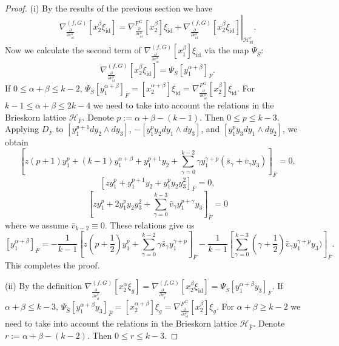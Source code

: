 \documentclass[reqno,12pt]{amsart}
\numberwithin{equation}{section}
\theoremstyle{plain}
\theoremstyle{definition}
\newcommand{\id}{\mathrm{id}}
\def\H{{\mathcal H}}
\numberwithin{equation}{section}
\begin{document}
\begin{proof}

(i) By the results of the previous section we have
\[
\nabla_{\frac{\partial}{\partial v^\alpha_{\id}}}^{(f,G)}[x_2^{\beta}\xi_{\id}] = \nabla^{F^G}_{\frac{\partial}{\partial v^\alpha_{\id}}}[x_2^{\beta}]\xi_{\id} + \left.\nabla_{\frac{\partial}{\partial v^\alpha_{\id}}}^{(f,G)}[x_2^{\beta}\xi_{\id}]\right\vert_{\H^c_{\id}}.
\]
Now we calculate the second term of $\nabla_{\frac{\partial}{\partial v^\alpha_{\id}}}^{(f,G)}[x_1^{\beta}]\xi_{\id}$ via the map $\Psi_{\bar{S}}$:
\[
\nabla_{\frac{\partial}{\partial v^\alpha_{\id}}}^{(f,G)}[x_2^{\beta}\xi_{\id}] = \Psi_{\bar{S}}[y_1^{\alpha+\beta}]_{\bar{F}}.
\]
If $0 \le \alpha+\beta \le k-2$, $\Psi_{\bar{S}} [y_1^{\alpha+\beta}]_{\bar{F}} = [x_2^{\alpha+\beta}]\xi_{\id} = \nabla^{F^G}_{\frac{\partial}{\partial v^\alpha_\id}}[x_2^{\beta}]\xi_{\id}$. For $k-1 \le\alpha+\beta \le 2k-4$ we need to take into account the relations in the Brieskorn lattice $\H_{\bar F}$. Denote $p := \alpha+\beta - (k-1)$. Then $0 \le p \le k-3$. Applying $D_{\bar{F}}$ to $[y_1^{p+1}dy_2\wedge dy_3]$, $-[y_1^{p}y_2dy_1 \wedge dy_3]$, and $[y_1^{p}y_3dy_1\wedge dy_2]$, we obtain
\[
[z (p+1) y_1^{p} + (k-1)y_1^{\alpha+\beta} + y_1^{p+1}y_2 + \sum_{\gamma=0}^{k-2} \gamma  y_1^{\gamma +p}(\bar{s}_\gamma + \bar{v}_\gamma y_3)]_{\bar{F}} = 0,
\]
\[
[z y_1^{p} + y_1^{p+1}y_2 + y_1^{p}y_2y_3^2] _{\bar{F}}= 0,
\]
\[
[z y_1^{p} + 2y_1^{p}y_2y_3^2 + \sum_{\gamma =0}^{k-3}\bar{v}_{\gamma}y_1^{p+\gamma}y_3] _{\bar{F}} = 0
\]
where we assume $\bar{v}_{k-2} \equiv 0$. These relations give us
\[
[y_1^{\alpha+\beta}]_{\bar{F}} = -\frac{1}{k-1}[z (p +\frac{1}{2}) y_1^{p} + \sum_{\gamma=0}^{k-2} \gamma \bar{s}_\gamma y_1^{\gamma +p}]_{\bar{F}}  -\frac{1}{k-1} [\sum_{\gamma=0}^{k-3} (\gamma + \frac{1}{2})\bar{v}_\gamma y_1^{\gamma+p} y_3)]_{\bar{F}}.
\]
This completes the proof.


(ii) By the definition $\nabla_{\frac{\partial}{\partial v^\beta_\id}}^{(f,G)}[x_2^{\alpha}\xi_g] = \nabla_{\frac{\partial}{\partial v^\alpha_{g}}}^{(f,G)}[x_2^{\beta}\xi_\id]  = \Psi_{\bar{S}}[y_1^{\alpha+\beta}y_3]_{\bar{F}}$.
If $\alpha+\beta \le k-3$, $\Psi_{\bar{S}}[y_1^{\alpha+\beta}y_3]_{\bar{F}} = [x_2^{\alpha+\beta}] \xi_g = \nabla^{F^G}_{\frac{\partial}{\partial v^\alpha_\id}}[x_2^{\beta}]\xi_{g}$. For $\alpha+\beta \ge k-2$ we need to take into account the relations in the Brieskorn lattice $\H_{\bar F}$. Denote $r := \alpha+\beta - (k-2)$. Then $0 \le r \le k-3$.


\end{proof}
\end{document}
